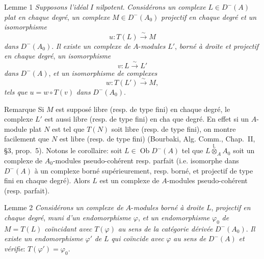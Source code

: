 \begin{statement}{Lemme 1}
\emph{Supposons l'idéal} $I$ \emph{nilpotent}. \emph{Considérons un complexe} $L\in D^-(A)$ \emph{plat en chaque degré}, \emph{un complexe} $M\in D^-(A_0)$ \emph{projectif en chaque degré et un isomorphisme}
\[
u:T(L)\xrightarrow{\sim}M
\]
\emph{dans} $D^-(A_0)$. \emph{Il existe un complexe de} $A$-\emph{modules} $L'$, \emph{borné à droite et projectif en chaque degré}, \emph{un isomorphisme}
\[
v:L\xrightarrow{\sim}L'
\]
\emph{dans} $D^-(A)$, \emph{et un isomorphisme de complexes}
\[
w:T(L')\xrightarrow{\sim}M,
\]
\emph{tels que} $u=w\circ T(v)$ \emph{dans} $D^-(A_0)$.
\end{statement}

\begin{statement}{Remarque}
Si $M$ est supposé libre (resp. de type fini) en chaque degré, le complexe $L'$ est aussi libre (resp. de type fini) en cha%
que
degré. En effet si un $A$-module plat $N$ est tel que $T(N)$ soit libre (resp. de type fini), on montre facilement que $N$ est libre (resp. de type fini) (Bourbaki, Alg. Comm., Chap.~II, §3, prop.~5). Notons le corollaire: soit $L\in\operatorname{Ob} D^-(A)$ tel que $L\overset{\mathbb{L}}{\otimes}_A A_0$ soit un complexe de $A_0$-modules pseudo-cohérent resp. parfait (i.e. isomorphe dans $D^-(A)$ à un complexe borné supérieurement, resp. borné, et projectif de type fini en chaque degré). Alors $L$ est un complexe de $A$-modules pseudo-cohérent (resp. parfait).
\end{statement}

\begin{statement}{Lemme 2}
\emph{Considérons un complexe de} $A$-\emph{modules borné à droite} $L$, \emph{projectif en chaque degré}, \emph{muni d'un endomorphisme} $\varphi$, \emph{et un endomorphisme} $\varphi_0$ \emph{de} $M=T(L)$ \emph{coïncidant avec} $T(\varphi)$ \emph{au sens de la catégorie dérivée} $D^-(A_0)$. \emph{Il existe un endomorphisme} $\varphi'$ \emph{de} $L$ \emph{qui coïncide avec} $\varphi$ \emph{au sens de} $D^-(A)$ \emph{et vérifie}: $T(\varphi')=\varphi_0$.
\end{statement}

